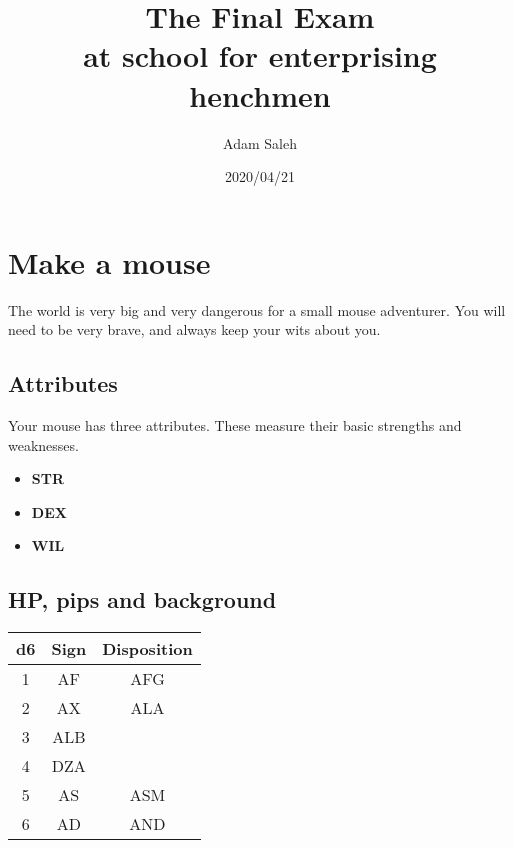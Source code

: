 \documentclass[letterpaper,twocolumn,openany,nodeprecatedcode]{article}
\title{The Final Exam \\
\large at school for enterprising henchmen }
\author{Adam Saleh}
\date{2020/04/21}
\begin{document}
\section{Make a mouse}

The world is very big and very dangerous for a small
mouse adventurer. You will need to be very brave, and
always keep your wits about you.

\subsection{Attributes}

Your mouse has three attributes. These measure their
basic strengths and weaknesses.

\begin{itemize}
  \item \textbf{STR}
  \item \textbf{DEX}
  \item \textbf{WIL}
\end{itemize}

\subsection{HP, pips and background}

{
\begin{tabular}{ c c c  }
d6 & Sign & Disposition \\
\hline
1 & AF & AFG \\
2 & AX   & ALA \\
3 & ALB \\
4 & DZA \\
5 & AS & ASM \\
6 & AD & AND   \\
\end{tabular}
}
\end{document}
